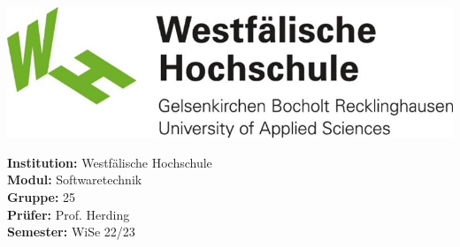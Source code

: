 \begin{titlepage}
    \maketitle
    \vspace{2cm}
    \begin{center}
        \includegraphics[width=\paperwidth/2]{../assets/img/whs}
    \end{center}
    \vspace*{\fill}
    \begin{flushleft}
        \Large{\textbf{Institution:} Westfälische Hochschule}\\
        \Large{\textbf{Modul:} Softwaretechnik} \\
        \Large{\textbf{Gruppe:} 25} \\
        \Large{\textbf{Prüfer:} Prof. Herding}\\
        \Large{\textbf{Semester:} WiSe 22/23}
    \end{flushleft}
\end{titlepage}
